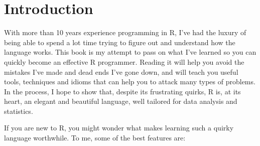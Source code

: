 
\chapter{Introduction}
\label{introduction}

With more than 10 years experience programming in R, I've had the luxury
of being able to spend a lot time trying to figure out and understand
how the language works. This book is my attempt to pass on what I've
learned so you can quickly become an effective R programmer. Reading it
will help you avoid the mistakes I've made and dead ends I've gone down,
and will teach you useful tools, techniques and idioms that can help you
to attack many types of problems. In the process, I hope to show that,
despite its frustrating quirks, R is, at its heart, an elegant and
beautiful language, well tailored for data analysis and statistics.

If you are new to R, you might wonder what makes learning such a quirky
language worthwhile. To me, some of the best features are:

